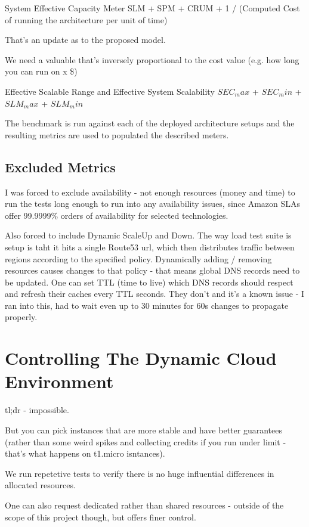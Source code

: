 \documentclass{uvamscse}
\begin{document}
System Effective Capacity Meter
SLM + SPM + CRUM + 1 / (Computed Cost of running the architecture per unit of time)

That's an update as to the proposed model.

We need a valuable that's inversely proportional to the cost value (e.g. how long you can run on x \$)

Effective Scalable Range and Effective System Scalability
$SEC_max$ + $SEC_min$ + $SLM_max$ + $SLM_min$

The benchmark is run against each of the deployed architecture setups and the resulting metrics are used to populated the described meters.

\subsection{Excluded Metrics}\label{Excluded Metrics}

I was forced to exclude availability - not enough resources (money and time) to run the tests long enough to run into any availability issues, since Amazon SLAs offer 99.9999\% orders of availability for selected technologies.

Also forced to include Dynamic ScaleUp and Down. The way load test suite is setup is taht it hits a single Route53 url, which then distributes traffic between regions according to the specified policy. Dynamically adding / removing resources causes changes to that policy - that means global DNS records need to be updated. One can set TTL (time to live) which DNS records should respect and refresh their caches every TTL seconds. They don't and it's a known issue - I ran into this, had to wait even up to 30 minutes for 60s changes to propagate properly.

\section{Controlling The Dynamic Cloud Environment}
tl;dr - impossible.

But you can pick instances that are more stable and have better guarantees (rather than some weird spikes and collecting credits if you run under limit - that's what happens on t1.micro isntances).

We run repetetive tests to verify there is no huge influential differences in allocated resources.

One can also request dedicated rather than shared resources - outside of the scope of this project though, but offers finer control.
\end{document}
